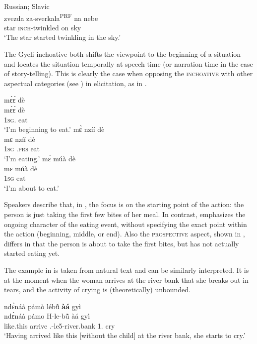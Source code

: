 \ea\label{Russian} Russian; Slavic \citep[226]{braginsky2008}\\
  \gll zvezda za-sverkala\textsuperscript{PRF} na nebe \\
      star  \textsc{inch}-twinkled on sky\\
\trans `The star started twinkling in the sky.'
\z

The Gyeli inchoative both shifts the viewpoint to the beginning of a situation and locates the situation temporally at speech time (or narration time in the case of story-telling). This is clearly the case when opposing the \textsc{inchoative} with other aspectual categories (see ) in elicitation, as in .

\ea\label{INCH11}
\ea \label{INCH11a}
  \glll  mɛ̀ɛ́ dè  \\
         mɛ̀ɛ́ dè\\
           1\textsc{sg}.{\INCH} eat\\
    \trans `I'm beginning to eat.'
\ex\label{INCH11b}
  \glll  mɛ̀ nzíí dè  \\
         mɛ nzíí dè\\
           1\textsc{sg} {\PROG}.\textsc{prs} eat\\
    \trans `I'm eating.'
\ex\label{INCH11c}
  \glll  mɛ̀ múà dè  \\
         mɛ múà dè\\
           1\textsc{sg} {\PROSP} eat\\
    \trans `I'm about to eat.'
\z
\z

\noindent Speakers describe that, in , the focus is on the starting point of the action: the person is just taking the first few bites of her meal. In contrast,  emphasizes the ongoing character of the eating event, without specifying the exact point within the action (beginning, middle, or end). Also the \textsc{prospective} aspect, shown in , differs in that the person is about to take the first bites, but has not actually started eating yet.

The example in  is taken from natural text and can be similarly interpreted. It is at the moment when the woman arrives at the river bank that she breaks out in tears, and the activity of crying is (theoretically) unbounded.

\ea\label{INCH1}
  \glll  ndɛ̀náà pámò lébũ̂ {\bfseries àá} gyì \\
         ndɛ̀náà pámo H-le-bũ̂ àá gyì \\
        like.this arrive {\OBJ}.{\LINK}-le5-river.bank 1.{\INCH} cry\\
    \trans `Having arrived like this [without the child] at the river bank, she starts to cry.'
\z

